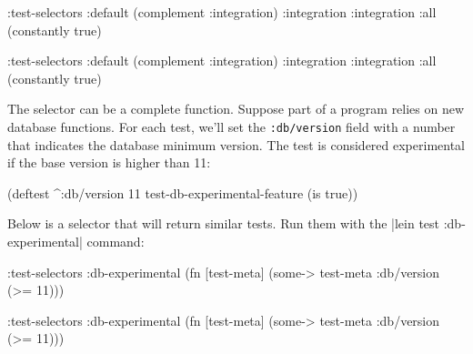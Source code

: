 \ifx\DEVICETYPE\MOBILE

\begin{english}
  \begin{clojure}
:test-selectors
  {:default (complement :integration)
   :integration :integration
   :all (constantly true)}
  \end{clojure}
\end{english}

\else

\begin{english}
  \begin{clojure}
:test-selectors {:default (complement :integration)
                 :integration :integration
                 :all (constantly true)}
  \end{clojure}
\end{english}

\fi

The selector can be a complete function. Suppose part of a program relies on new database functions. For each test, we'll set the \verb|:db/version| field with a number that indicates the database minimum version. The test is considered experimental if the base version is higher than 11:

\begin{english}
  \begin{clojure}
(deftest ^{:db/version 11}
  test-db-experimental-feature
  (is true))
  \end{clojure}
\end{english}

Below is a selector that will return similar tests. Run them with the \spverb|lein test :db-experimental| command:

\ifx\DEVICETYPE\MOBILE

\begin{english}
  \begin{clojure}
:test-selectors
  {:db-experimental
   (fn [test-meta]
     (some-> test-meta
             :db/version
             (>= 11)))}
  \end{clojure}
\end{english}

\else

\begin{english}
  \begin{clojure}
:test-selectors {:db-experimental
                 (fn [test-meta]
                   (some-> test-meta :db/version (>= 11)))}
  \end{clojure}
\end{english}

